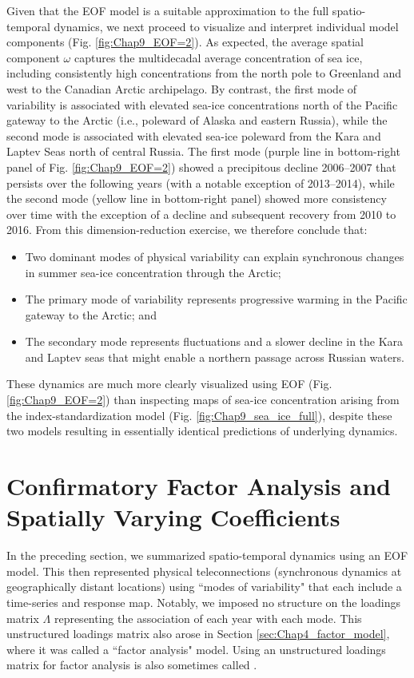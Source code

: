Given that the EOF model is a suitable approximation to the full spatio-temporal dynamics, we next proceed to visualize and interpret individual model components (Fig. \ref{fig:Chap9_EOF=2}).  As expected, the average spatial component \( \omega \) captures the multidecadal average concentration of sea ice, including consistently high concentrations from the north pole to Greenland and west to the Canadian Arctic archipelago. By contrast, the first mode of variability is associated with elevated sea-ice concentrations north of the Pacific gateway to the Arctic (i.e., poleward of Alaska and eastern Russia), while the second mode is associated with elevated sea-ice poleward from the Kara and Laptev Seas north of central Russia.  The first mode (purple line in bottom-right panel of Fig. \ref{fig:Chap9_EOF=2}) showed a precipitous decline 2006--2007 that persists over the following years (with a notable exception of 2013--2014), while the second mode (yellow line in bottom-right panel) showed more consistency over time with the exception of a decline and subsequent recovery from 2010 to 2016.  From this dimension-reduction exercise, we therefore conclude that:
\begin{itemize}
    \item Two dominant modes of physical variability can explain synchronous changes in summer sea-ice concentration through the Arctic;

    \item The primary mode of variability represents progressive warming in the Pacific gateway to the Arctic; and

    \item The secondary mode represents fluctuations and a slower decline in the Kara and Laptev seas that might enable a northern passage across Russian waters.
\end{itemize}
These dynamics are much more clearly visualized using EOF (Fig. \ref{fig:Chap9_EOF=2}) than inspecting maps of sea-ice concentration arising from the index-standardization model (Fig. \ref{fig:Chap9_sea_ice_full}), despite these two models resulting in essentially identical predictions of underlying dynamics.  

\section{Confirmatory Factor Analysis and Spatially Varying Coefficients} \label{sec:Chap9_confirmatory_factor_model}

In the preceding section, we summarized spatio-temporal dynamics using an EOF model.  This then represented physical teleconnections (synchronous dynamics at geographically distant locations) using ``modes of variability" that each include a time-series and response map.  Notably, we imposed no structure on the loadings matrix \( \Lambda \) representing the association of each year with each mode.  This unstructured loadings matrix also arose in Section \ref{sec:Chap4_factor_model}, where it was called a ``factor analysis" model.  Using an unstructured loadings matrix for factor analysis is also sometimes called .  

